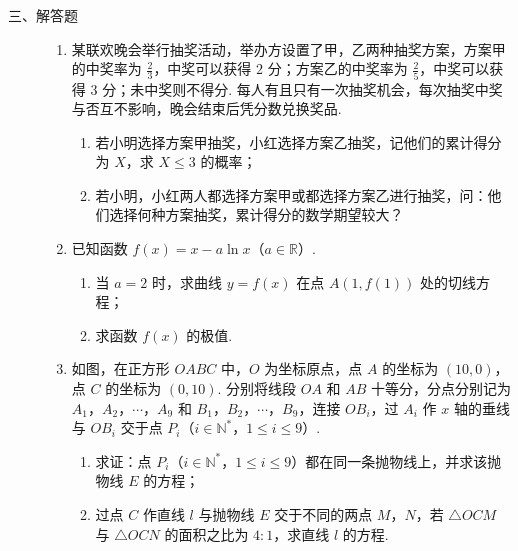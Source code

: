 \begin{description}

    \item[三、解答题]

    \begin{enumerate}[leftmargin=5pt]

      \addtocounter{enumi}{+15}

        \item 某联欢晚会举行抽奖活动，举办方设置了甲，乙两种抽奖方案，方案甲的中奖率为 \(\frac{2}{3}\)，中奖可以获得 \(2\) 分；方案乙的中奖率为 \(\frac{2}{5}\)，中奖可以获得 \(3\) 分；未中奖则不得分. 每人有且只有一次抽奖机会，每次抽奖中奖与否互不影响，晚会结束后凭分数兑换奖品.

\begin{enumerate}
\item 若小明选择方案甲抽奖，小红选择方案乙抽奖，记他们的累计得分为 \(X\)，求 \(X \leqslant 3\) 的概率；
\item 若小明，小红两人都选择方案甲或都选择方案乙进行抽奖，问：他们选择何种方案抽奖，累计得分的数学期望较大？
\end{enumerate}

        \item 已知函数 \(f(x) = x - a \ln x\)（\(a \in \mathbb{R}\)）.

\begin{enumerate}
\item 当 \(a = 2\) 时，求曲线 \(y = f(x)\) 在点 \(A(1, f(1))\) 处的切线方程；
\item 求函数 \(f(x)\) 的极值.
\end{enumerate}

        \item 如图，在正方形 \(OABC\) 中，\(O\) 为坐标原点，点 \(A\) 的坐标为 \((10,0)\)，点 \(C\) 的坐标为 \((0,10)\). 分别将线段 \(OA\) 和 \(AB\) 十等分，分点分别记为 \(A_1\)，\(A_2\)，\(\cdots\)，\(A_9\) 和 \(B_1\)，\(B_2\)，\(\cdots\)，\(B_9\)，连接 \(OB_i\)，过 \(A_i\) 作 \(x\) 轴的垂线与 \(OB_i\) 交于点 \(P_i\)（\(i \in \mathbb{N}^{*}\)，\(1 \leqslant i \leqslant 9\)）.

\begin{enumerate}
\item 求证：点 \(P_i\)（\(i \in \mathbb{N}^{*}\)，\(1 \leqslant i \leqslant 9\)）都在同一条抛物线上，并求该抛物线 \(E\) 的方程；
\item 过点 \(C\) 作直线 \(l\) 与抛物线 \(E\) 交于不同的两点 \(M\)，\(N\)，若 \(\triangle OCM\) 与 \(\triangle OCN\) 的面积之比为 \(4 : 1\)，求直线 \(l\) 的方程.
\end{enumerate}


\end{enumerate}
\end{description}
